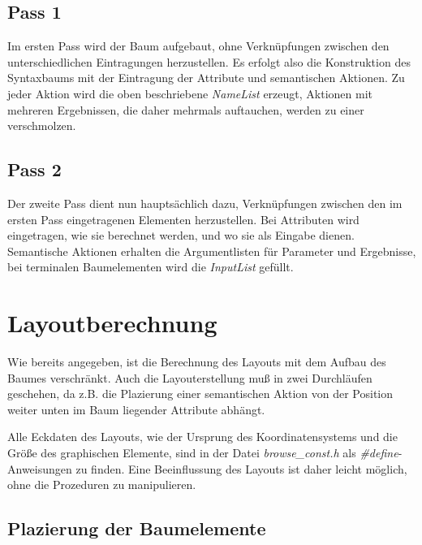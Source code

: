 \subsection{Pass 1}

Im ersten Pass wird der Baum aufgebaut, ohne Verkn\"upfungen zwischen den unterschiedlichen Eintragungen herzustellen. Es erfolgt also die Konstruktion
des Syntaxbaums mit der Eintragung der Attribute und semantischen Aktionen. Zu jeder Aktion wird die oben beschriebene {\it NameList} erzeugt, Aktionen
mit mehreren Ergebnissen, die daher mehrmals auftauchen, werden zu einer verschmolzen.

\subsection{Pass 2}

Der zweite Pass dient nun haupts\"achlich dazu, Verkn\"upfungen zwischen den im ersten Pass eingetragenen Elementen herzustellen. Bei Attributen wird
eingetragen, wie sie berechnet werden, und wo sie als Eingabe dienen. Semantische Aktionen erhalten die Argumentlisten f\"ur Parameter und Ergebnisse,
bei terminalen Baumelementen wird die {\it InputList} gef\"ullt.

\section{Layoutberechnung}

Wie bereits angegeben, ist die Berechnung des Layouts mit dem Aufbau des Baumes verschr\"ankt. Auch die Layouterstellung mu\ss{} in zwei Durchl\"aufen
geschehen, da z.B. die Plazierung einer semantischen Aktion von der Position weiter unten im Baum liegender Attribute abh\"angt.

Alle Eckdaten des Layouts, wie der Ursprung des Koordinatensystems und die Gr\"o\ss{}e des graphischen Elemente, sind in der Datei {\it browse\_const.h} als
{\it \#define}-Anweisungen zu finden. Eine Beeinflussung des Layouts ist daher leicht m\"oglich, ohne die Prozeduren zu manipulieren.

\subsection{Plazierung der Baumelemente}

